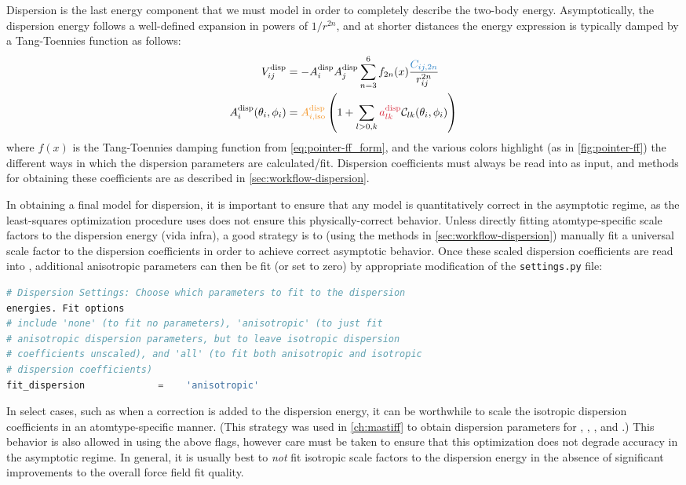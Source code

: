 Dispersion is the last energy component that we must model in order to
completely describe the two-body energy. Asymptotically, the dispersion energy follows a
well-defined expansion in powers of $1/r^{2n}$, and at shorter distances the
energy expression is typically damped by a Tang-Toennies
function\cite{Tang1984,Tang1992} as follows:
%
\begin{align}
\vdisp_{ij} &= -{\Adisp{i}\Adisp{j}} \sum\limits_{n=3}^{6} f_{2n}(x)
\frac{\textcolor{mon}{C_{ij,2n}}}{r_{ij}^{2n}} \\
\Adisp{i}(\theta_i,\phi_i) &=
\textcolor{cfit}{\Adisp{i,\text{iso}}}
\left(1 +
\sum\limits_{l>0,k} \textcolor{fit}{\adisp}  \mathcal{C}_{lk}(\theta_i,\phi_i)
\right)
\end{align}
%
where $f(x)$ is the Tang-Toennies damping function from
\cref{eq:pointer-ff_form}, and the various colors highlight (as in
\cref{fig:pointer-ff}) the different ways in which the dispersion parameters
are calculated/fit.
Dispersion coefficients must always be read into
\pointer as input, and methods for obtaining these coefficients are as
described in  \cref{sec:workflow-dispersion}. 

In obtaining a final model for dispersion, it is important to ensure that any
model is quantitatively correct in the asymptotic regime, as the
least-squares optimization procedure \pointer uses does not ensure this
physically-correct behavior. Unless directly fitting atomtype-specific scale
factors to the dispersion energy (vida infra), a good strategy is to (using
the methods in \cref{sec:workflow-dispersion}) manually fit a universal scale factor to
the dispersion coefficients in order to achieve correct asymptotic behavior.
Once these scaled dispersion coefficients are read into \pointer, additional
anisotropic parameters can then be fit (or set to zero) by appropriate
modification of the \verb|settings.py| file:
\begin{lstlisting}[language=python]
# Dispersion Settings: Choose which parameters to fit to the dispersion
energies. Fit options
# include 'none' (to fit no parameters), 'anisotropic' (to just fit
# anisotropic dispersion parameters, but to leave isotropic dispersion
# coefficients unscaled), and 'all' (to fit both anisotropic and isotropic
# dispersion coefficients)
fit_dispersion             =    'anisotropic'
\end{lstlisting}

In select cases, such as when a \dccsdt correction is added to the
dispersion energy, it can be worthwhile to scale the isotropic
dispersion coefficients in an atomtype-specific manner. (This strategy was
used in \cref{ch:mastiff} to obtain dispersion parameters for \co, \nh, \ho,
and \cl.) This behavior is also allowed in \pointer using the above flags,
however care must be taken to ensure that this optimization does not degrade
accuracy in the asymptotic regime. In general, it is usually best to
\emph{not} fit isotropic scale factors to the dispersion energy in the absence
of significant improvements to the overall force field fit quality.

